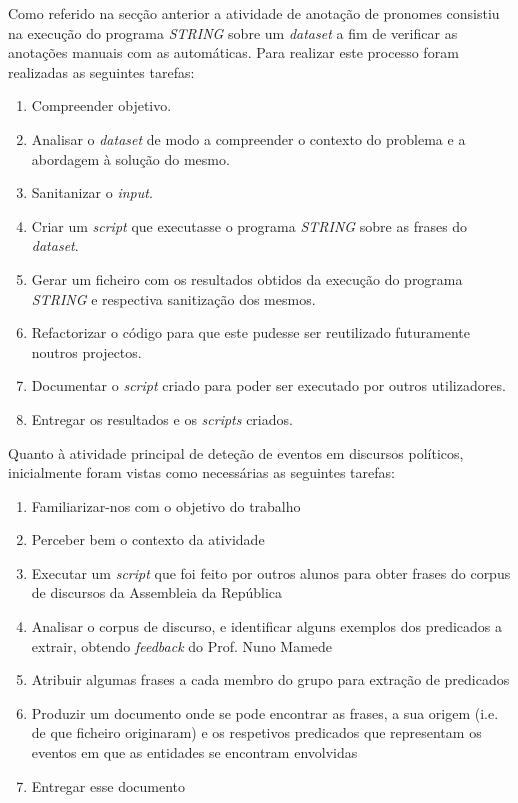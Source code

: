 \documentclass[a4paper,12pt,journal,twoside,compsoc]{PPIEEEtran}
\begin{document}
Como referido na secção anterior a atividade de anotação de pronomes consistiu na execução do programa \textit{STRING} sobre um \textit{dataset} a fim de verificar as anotações manuais com as automáticas. Para realizar este processo foram realizadas as seguintes tarefas:
\begin{enumerate}
\item Compreender objetivo.
\item Analisar o \textit{dataset} de modo a compreender o contexto do problema e a abordagem à solução do mesmo.
\item Sanitanizar o \textit{input}.
\item Criar um \textit{script} que executasse o programa \textit{STRING} sobre as frases do \textit{dataset}.
\item Gerar um ficheiro com os resultados obtidos da execução do programa \textit{STRING} e respectiva sanitização dos mesmos.
\item Refactorizar o código para que este pudesse ser reutilizado futuramente noutros projectos.
\item Documentar o \textit{script} criado para poder ser executado por outros utilizadores.
\item Entregar os resultados e os \textit{scripts} criados.
\end{enumerate}

Quanto à atividade principal de deteção de eventos em discursos políticos, inicialmente foram vistas como necessárias as seguintes tarefas:
\begin{enumerate}
\item Familiarizar-nos com o objetivo do trabalho
\item Perceber bem o contexto da atividade
\item Executar um \textit{script} que foi feito por outros alunos para obter frases do corpus de discursos da Assembleia da República
\item Analisar o corpus de discurso, e identificar alguns exemplos dos predicados a extrair, obtendo \textit{feedback} do Prof. Nuno Mamede
\item Atribuir algumas frases a cada membro do grupo para extração de predicados
\item Produzir um documento onde se pode encontrar as frases, a sua origem (i.e. de que ficheiro originaram) e os respetivos predicados que representam os eventos em que as entidades se encontram envolvidas
\item Entregar esse documento
\end{enumerate}
\end{document}
